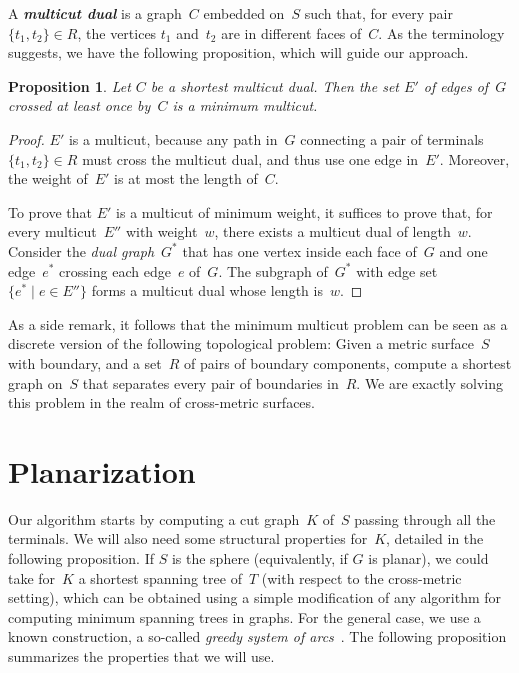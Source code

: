 \documentclass[11pt]{article}
\newcommand{\emphdef}[1]{\textcolor{blueblack}{\textbf{\emph{#1}}}}
\newcommand{\set}[1]{\ensuremath{\{#1\}}}
\theoremstyle{plain}  \newtheorem{theorem}{Theorem}[section]
\newtheorem{proposition}[theorem]{Proposition}
\theoremstyle{definition}
\begin{document}
A \emphdef{multicut dual} is a graph~$C$ embedded on~$S$ such that, for
every pair $\set{t_1,t_2}\in R$, the vertices $t_1$ and~$t_2$ are in different
faces of~$C$.  As the terminology suggests, we have the following
proposition, which will guide our approach.
\begin{proposition}\label{P:dual}
  Let $C$ be a shortest multicut dual.  Then the set $E'$ of edges of~$G$
  crossed at least once by~$C$ is a minimum multicut.
\end{proposition}
\begin{proof}
  $E'$ is a multicut, because any path in~$G$ connecting a pair of
  terminals $\set{t_1,t_2}\in R$ must cross the multicut dual, and thus use
  one edge in~$E'$.  Moreover, the weight of~$E'$ is at most the length
  of~$C$.

  To prove that $E'$ is a multicut of minimum weight, it suffices to prove
  that, for every multicut~$E''$ with weight~$w$, there exists a multicut
  dual of length~$w$.  Consider the \emph{dual graph}~$G^*$ that has one
  vertex inside each face of~$G$ and one edge~$e^*$ crossing each edge~$e$
  of~$G$.  The subgraph of~$G^*$ with edge set $\set{e^*\mid e\in E''}$
  forms a multicut dual whose length is~$w$.
\end{proof}

As a side remark, it follows that the minimum multicut problem can be seen
as a discrete version of the following topological problem: Given a metric
surface~$S$ with boundary, and a set~$R$ of pairs of boundary components,
compute a shortest graph on~$S$ that separates every pair of boundaries
in~$R$.  We are exactly solving this problem in the realm of cross-metric
surfaces.

\section{Planarization}\label{S:cutgraph}

Our algorithm starts by computing a cut graph~$K$ of~$S$ passing through
all the terminals.  We will also need some structural properties for~$K$,
detailed in the following proposition.  If $S$ is the sphere (equivalently,
if $G$ is planar), we could take for~$K$ a shortest spanning tree of~$T$
(with respect to the cross-metric setting), which can be obtained using a
simple modification of any algorithm for computing minimum spanning trees
in graphs.  For the general case, we use a known construction, a so-called
\emph{greedy system of arcs}~\cite{ccelw-scsh-08}.  The following
proposition summarizes the properties that we will use.
\end{document}
